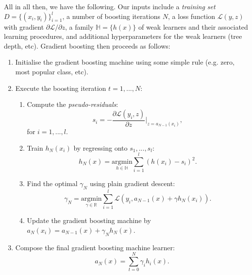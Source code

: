 All in all then, we have the following. Our inputs include a \textit{training set} $D = \{(x_i, y_i)\}_{i=1}^{l}$, a number of boosting iterations $N$, a loss function $\mathcal{L}(y,z)$ with gradient $\partial \mathcal{L}/\partial z$, a family $\mathbb{H} = \{h(x)\}$ of weak learners and their associated learning procedures, and additional hyperparameters for the weak learners (tree depth, etc). Gradient boosting then proceeds as follows:
\begin{enumerate}[label = (\arabic*)]
\item Initialise the gradient boosting machine using some simple rule (e.g. zero, most popular class, etc).
\item Execute the boosting iteration $t=1,...,N$:
\begin{enumerate}[label = (\roman*)]
\item Compute the \textit{pseudo-residuals}:
\begin{equation*}
s_i = -\frac{\partial \mathcal{L}(y_i,z)}{\partial z}\bigg|_{z = a_{N-1}(x_i)},
\end{equation*}
for $i=1,...,l$.
\item Train $h_N(x_i)$ by regressing onto $s_1,...,s_l$:
\begin{equation*}
h_N(x) = \underset{h \in \mathbb{H}}{\textrm{argmin}} \sum_{i=1}^{l} (h(x_i) - s_i)^2.
\end{equation*}
\item Find the optimal $\gamma_N$ using plain gradient descent:
\begin{equation*}
\gamma_N = \underset{\gamma \in \mathbb{R}}{\textrm{argmin}}\sum_{i=1}^{l} \mathcal{L}(y_i, a_{N-1}(x) + \gamma h_N(x_i)).
\end{equation*}
\item Update the gradient boosting machine by $a_{N}(x_i) = a_{N-1}(x) + \gamma_N h_N(x)$.
\end{enumerate}
\item Compose the final gradient boosting machine learner:
\begin{equation*}
a_N(x) = \sum_{t=0}^{N} \gamma_i h_i(x).
\end{equation*}
\end{enumerate}


